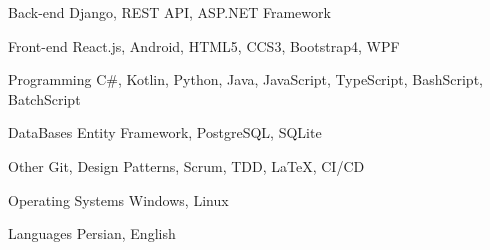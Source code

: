 

\begin{cvskills}

  \cvskill
  {Back-end} %
  {Django, REST API, ASP.NET Framework} %

  \cvskill
  {Front-end} %
  {React.js, Android, HTML5, CCS3, Bootstrap4, WPF} %

  \cvskill
  {Programming} %
  {C\#, Kotlin, Python, Java, JavaScript, TypeScript, BashScript, BatchScript} %

  \cvskill
  {DataBases} %
  {Entity Framework, PostgreSQL, SQLite} %


  \cvskill
  {Other} %
  {Git, Design Patterns, Scrum, TDD, \LaTeX, CI/CD} %


  \cvskill
  {Operating Systems} %
  {Windows, Linux} %


  \cvskill
  {Languages} %
  {Persian, English} %


\end{cvskills}
